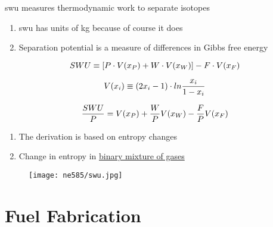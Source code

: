 \documentclass[aspectratio=1610,pdftex,dvipsnames,compress,xcolor={dvipsnames}]{beamer}
\newcommand{\acs}{\acrshort} %
\begin{document}
\begin{frame}{\acs{swu} measures thermodynamic work to separate isotopes}
    \begin{enumerate}[series=outerlist,topsep=0pt,itemsep=11pt,leftmargin=*,label=(\arabic*)]
        \item[]\acs{swu} has units of kg because of course it does
        \item[]Separation potential is a measure of differences in Gibbs free energy
    \end{enumerate}

    \vspace*{\fill}

    \begin{equation}
        \LARGE
        SWU \equiv [P \cdot V(x_P)+W \cdot V(x_W)]-F \cdot V(x_F)
    \end{equation}

    \begin{equation}
        \LARGE 
        V(x_i) \equiv (2x_i - 1) \cdot ln \frac{x_i}{1-x_i}
    \end{equation}
    
    \begin{equation}
        \LARGE 
        \frac{SWU}{P} = V(x_P) + \frac{W}{P}V(x_W) - \frac{F}{P}V(x_F)
    \end{equation}
    
    \vspace*{\fill}

    \begin{enumerate}[series=outerlist,topsep=0pt,itemsep=11pt,leftmargin=*,label=(\arabic*)]
        \item[]The derivation is based on entropy changes
        \item[]Change in entropy in \href{https://drive.google.com/file/d/0B1ENwqH9aCq5UnZ4NHNCdHZfN1U/view?resourcekey=0-WXKzU2rJK0q2qVPJcDhutQ}{binary mixture of gases}
    \end{enumerate}
\end{frame}


\begin{frame}{}
    \begin{figure}
        \centering
        \texttt{[image: ne585/swu.jpg]}
    \end{figure}
\end{frame}


\section{Fuel Fabrication}
\end{document}
